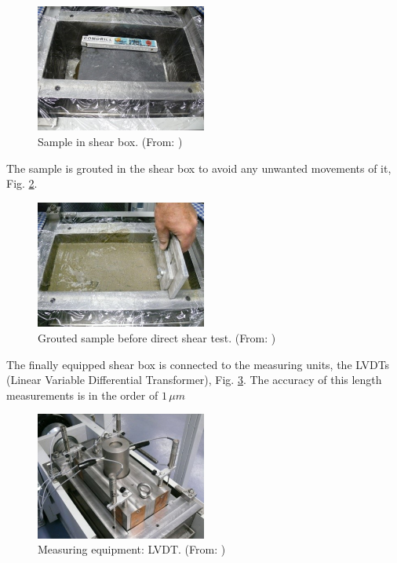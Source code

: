 \begin{figure}[!ht]
\begin{center}
\includegraphics[width=0.5\textwidth]{./figures/ExpCNLSampleInShearBox.jpg}
\end{center}
\caption{Sample in shear box. (From: \cite{Nguyen2014})}
\label{fig:ExpCNLSampleInShearBox}
\end{figure}

The sample is grouted in the shear box to avoid any unwanted movements of it, Fig. \ref{fig:ExpCNLGroutedSample}.\\

\begin{figure}[!ht]
\begin{center}
\includegraphics[width=0.5\textwidth]{./figures/ExpCNLGroutedSample.jpg}
\end{center}
\caption{Grouted sample before direct shear test. (From: \cite{Nguyen2014})}
\label{fig:ExpCNLGroutedSample}
\end{figure}

The finally equipped shear box is connected to the measuring units, the LVDTs (Linear Variable Differential Transformer), Fig. \ref{fig:ExpCNLLVDT}. The accuracy of this length measurements is in the order of $1\,\mu m$

\begin{figure}[!ht]
\begin{center}
\includegraphics[width=0.5\textwidth]{./figures/ExpCNLLVDT.jpg}
\end{center}
\caption{Measuring equipment: LVDT. (From: \cite{Nguyen2014})}
\label{fig:ExpCNLLVDT}
\end{figure}

